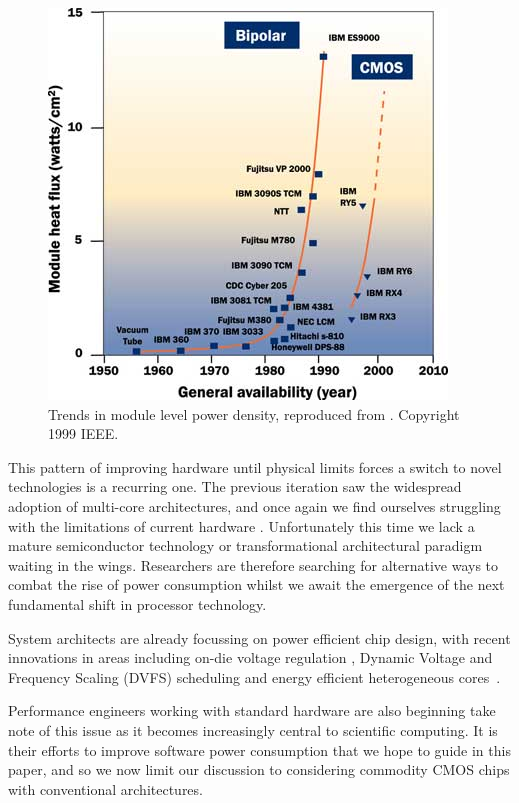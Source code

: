 \begin{figure}[ht]
\centering
\includegraphics[width=0.9\linewidth]{Images/bipolarcmos.jpg}
\caption{Trends in module level power density, reproduced from \cite{chu:1999aa}. Copyright 1999 IEEE.}
\end{figure}
This pattern of improving hardware until physical limits forces a switch to novel technologies is a recurring one. The previous iteration saw the widespread adoption of multi-core architectures, and once again we find ourselves struggling with the limitations of current hardware \cite{esmaeilzadeh:2011aa}. Unfortunately this time we lack a mature semiconductor technology or transformational architectural paradigm waiting in the wings. Researchers are therefore searching for alternative ways to combat the rise of power consumption whilst we await the emergence of the next fundamental shift in processor technology. \golden

System architects are already focussing on power efficient chip design, with recent innovations in areas including on-die voltage regulation \cite{burton:2014aa}, Dynamic Voltage and Frequency Scaling (DVFS) scheduling \cite{kwon:2013aa} and energy efficient heterogeneous cores~\cite{gupta:2012aa}.\golden

Performance engineers working with standard hardware are also beginning take note of this issue as it becomes increasingly central to scientific computing. It is their efforts to improve software power consumption that we hope to guide in this paper, and so we now limit our discussion to considering commodity CMOS chips with conventional architectures. \golden

